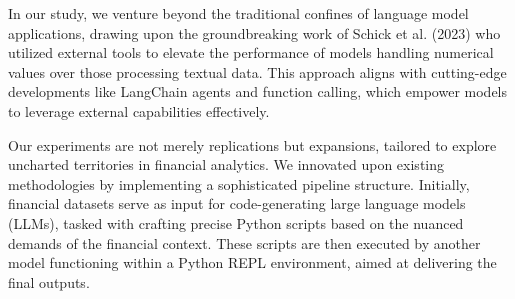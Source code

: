 \documentclass[logo,msc]{infthesis}           %
\begin{document}
In our study, we venture beyond the traditional confines of language model applications, drawing upon the groundbreaking work of Schick et al. (2023) who utilized external tools to elevate the performance of models handling numerical values over those processing textual data. This approach aligns with cutting-edge developments like LangChain agents and function calling, which empower models to leverage external capabilities effectively.

Our experiments are not merely replications but expansions, tailored to explore uncharted territories in financial analytics. We innovated upon existing methodologies by implementing a sophisticated pipeline structure. Initially, financial datasets serve as input for code-generating large language models (LLMs), tasked with crafting precise Python scripts based on the nuanced demands of the financial context. These scripts are then executed by another model functioning within a Python REPL environment, aimed at delivering the final outputs.
\end{document}

